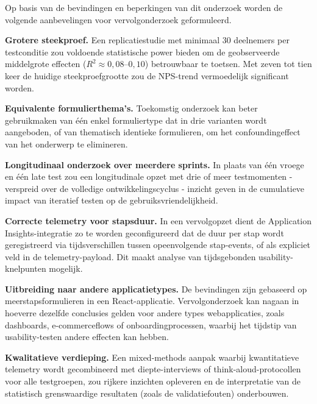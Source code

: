 Op basis van de bevindingen en beperkingen van dit onderzoek worden de volgende aanbevelingen voor vervolgonderzoek geformuleerd.

\textbf{Grotere steekproef.} Een replicatiestudie met minimaal 30 deelnemers per testconditie zou voldoende statistische power bieden om de geobserveerde middelgrote effecten ($R^2 \approx 0{,}08$–$0{,}10$) betrouwbaar te toetsen. Met zeven tot tien keer de huidige steekproefgrootte zou de NPS-trend vermoedelijk significant worden.

\textbf{Equivalente formulierthema's.} Toekomstig onderzoek kan beter gebruikmaken van één enkel formuliertype dat in drie varianten wordt aangeboden, of van thematisch identieke formulieren, om het confoundingeffect van het onderwerp te elimineren.

\textbf{Longitudinaal onderzoek over meerdere sprints.} In plaats van één vroege en één late test zou een longitudinale opzet met drie of meer testmomenten - verspreid over de volledige ontwikkelingscyclus - inzicht geven in de cumulatieve impact van iteratief testen op de gebruiksvriendelijkheid.

\textbf{Correcte telemetry voor stapsduur.} In een vervolgopzet dient de Application Insights-integratie zo te worden geconfigureerd dat de duur per stap wordt geregistreerd via tijdsverschillen tussen opeenvolgende stap-events, of als expliciet veld in de telemetry-payload. Dit maakt analyse van tijdsgebonden usability-knelpunten mogelijk.

\textbf{Uitbreiding naar andere applicatietypes.} De bevindingen zijn gebaseerd op meerstapsformulieren in een React-applicatie. Vervolgonderzoek kan nagaan in hoeverre dezelfde conclusies gelden voor andere types webapplicaties, zoals dashboards, e-commerceflows of onboardingprocessen, waarbij het tijdstip van usability-testen andere effecten kan hebben.

\textbf{Kwalitatieve verdieping.} Een mixed-methods aanpak waarbij kwantitatieve telemetry wordt gecombineerd met diepte-interviews of think-aloud-protocollen voor alle testgroepen, zou rijkere inzichten opleveren en de interpretatie van de statistisch grenswaardige resultaten (zoals de validatiefouten) onderbouwen.
